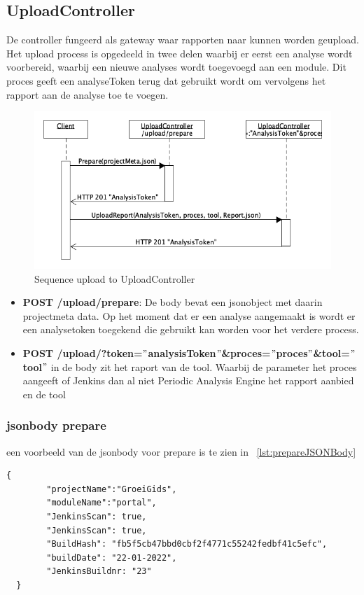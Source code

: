 \subsection{UploadController}\label{subsec:uploadcontroller}
De controller fungeerd als gateway waar rapporten naar kunnen worden geupload. Het upload process is opgedeeld in twee delen waarbij er eerst een analyse wordt voorbereid, waarbij een nieuwe analyses wordt toegevoegd aan een module. Dit proces geeft een analyseToken terug dat gebruikt wordt om vervolgens het rapport aan de analyse toe te voegen.
\begin{figure}[bth]
    \myfloatalign
    \includegraphics[width=12cm]{gfx/umlet/exports/SeqAddReport}
    \caption{Sequence upload to UploadController}
    \label{fig:SequenceClientUploadReport}
\end{figure}

\begin{itemize}
    \item \textbf{POST /upload/prepare}: De body bevat een jsonobject met daarin projectmeta data. Op het moment dat er een analyse aangemaakt is wordt er een analysetoken toegekend die gebruikt kan worden voor het verdere process.
    \item \textbf{POST /upload/?token=$"$analysisToken$"$\&proces=$"$proces$"$\&tool=$"$tool$"$} in de body zit het raport van de tool. Waarbij de parameter het proces aangeeft of Jenkins dan al niet Periodic Analysis Engine het rapport aanbied en de tool
\end{itemize}

\subsubsection{jsonbody prepare}
een voorbeeld van de jsonbody voor prepare is te zien in ~\ref{lst:prepareJSONBody}
\begin{lstlisting}[caption={Datamodel vanuit Jenkins},label=lst:prepareJSONBody]
    {
        "projectName":"GroeiGids",
        "moduleName":"portal",
        "JenkinsScan": true,
        "JenkinsScan": true,
        "BuildHash": "fb5f5cb47bbd0cbf2f4771c55242fedbf41c5efc",
        "buildDate": "22-01-2022",
        "JenkinsBuildnr: "23"
  }
\end{lstlisting}


